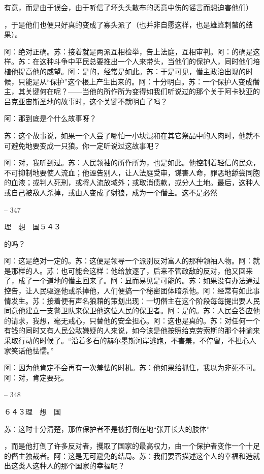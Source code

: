 \documentclass[11pt,oneside]{book}
\begin{document}
\begin{common-format}
    有意，而是由于误会，由于听信了坏头头散布的恶意中伤的谣言而想迫害他们）

    ，于是他们也便只好真的变成了寡头派了（也并非自愿这样，也是雄蜂刺螯的结果）。

    阿：绝对正确。苏：接着就是两派互相检举，告上法庭，互相审判。阿：的确是这样。苏：在这种斗争中平民总要推出一个人来带头，当他们的保护人，同时他们培植他提高他的威望。阿：是的，经常是如此。苏：于是可见，僭主政治出现的时候，只能是从“保护”这个根上产生出来的。阿：十分明白。苏：一个保护人变成僭主，其关键何在呢？——当他的所作所为变得如我们听说过的那个关于阿卡狄亚的吕克亚宙斯圣地的故事时，这个关键不就明白了吗？

    阿：那到底是个什么故事呀？

    苏：这个故事说，如果一个人尝了哪怕一小块混和在其它祭品中的人肉时，他就不可避免地要变成一只狼。你一定听说过这故事吧？

    阿：对，我听到过。苏：人民领袖的所作所为，也是如此。他控制着轻信的民众，不可抑制地要使人流血；他诬告别人，让人法庭受审，谋害人命，罪恶地舔尝同胞的血液；或判人死刑，或将人流放域外；或取消债款，或分人土地。最后，这种人或自己被敌人杀掉，或由人变成了豺狼，成为一个僭主。这不是必然

    

-- 347

    理　想　国５４３

    的吗？

    阿：这是绝对一定的。苏：这便是领导一个派别反对富人的那种领袖人物。阿：就是那样的人。苏：也可能会这样：他给放逐了，后来不管政敌的反对，他又回来了，成了一个道地的僭主回来了。阿：显而易见是可能的。苏：如果没有办法通过控告，让人民驱逐他或杀掉他，人们便搞一个秘密团体暗杀他。阿：经常有如此事情发生。苏：接着便有声名狼藉的策划出现：一切僭主在这个阶段每每提出要人民同意他建立一支警卫队来保卫他这位人民的保卫者。阿：是的。苏：人民会答应他的请求，我想，毫无戒心，只替他的安全担心。阿：这也是真的。苏：对任何一个有钱的同时又有人民公敌嫌疑的人来说，如今该是他按照给克劳索斯的那个神谕来采取行动的时候了。“沿着多石的赫尔墨斯河岸逃跑，不害羞，不停留，不担心人家笑话他怯懦。”

    阿：因为他肯定不会再有一次羞怯的时机。苏：他如果给抓住，我以为非死不可。阿：对，肯定要死。

    

-- 348

    ６４３理　想　国

    苏：这时十分清楚，那位保护者不是被打倒在地“张开长大的肢体”

    ，而是他打倒了许多反对者，攫取了国家的最高权力，由一个保护者变作一个十足的僭主独裁者。阿：这是无可避免的结局。苏：我们要否描述这个人的幸福和造就出这类人这种人的那个国家的幸福呢？


\end{common-format}
\end{document}
